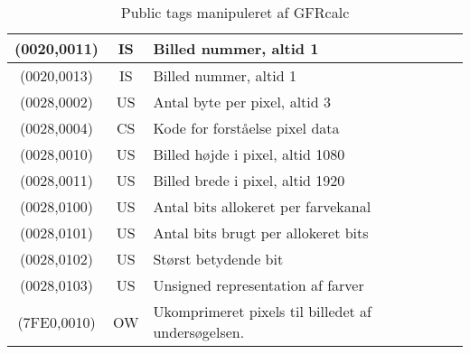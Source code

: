 \documentclass{article}
\begin{document}
\begin{table}
\begin{center}
\begin{tabular}{|c|c|p{7cm}|}
	(0020,0011) & IS & Billed nummer, altid 1 \\ \hline
	(0020,0013) & IS & Billed nummer, altid 1 \\ \hline
	(0028,0002) & US & Antal byte per pixel, altid 3 \\ \hline
	(0028,0004) & CS & Kode for forståelse pixel data \\ \hline
	(0028,0010) & US & Billed højde i pixel, altid 1080 \\ \hline
	(0028,0011) & US & Billed brede i pixel, altid 1920 \\ \hline
	(0028,0100) & US & Antal bits allokeret per farvekanal \\ \hline
	(0028,0101) & US & Antal bits brugt per allokeret bits \\ \hline
	(0028,0102) & US & Størst betydende bit  \\ \hline
	(0028,0103) & US & Unsigned representation af farver\\ \hline
	(7FE0,0010) & OW & Ukomprimeret pixels til billedet af undersøgelsen.\\ \hline
\end{tabular}
\end{center}
\caption{Public tags manipuleret af GFRcalc}
\end{table}
\end{document}
